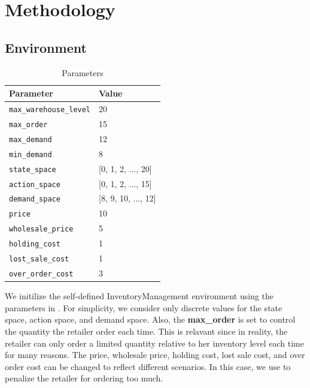 \section{Methodology}
\subsection{Environment}
\begin{table}[H]
    \centering
    \begin{tabular}{|l|l|}
        \hline
        \textbf{Parameter}             & \textbf{Value}      \\
        \hline
        \texttt{max\_warehouse\_level} & 20                  \\
        \texttt{max\_order}            & 15                  \\
        \texttt{max\_demand}           & 12                  \\
        \texttt{min\_demand}           & 8                   \\
        \texttt{state\_space}          & [0, 1, 2, ..., 20]  \\
        \texttt{action\_space}         & [0, 1, 2, ..., 15]  \\
        \texttt{demand\_space}         & [8, 9, 10, ..., 12] \\
        \texttt{price}                 & 10                  \\
        \texttt{wholesale\_price}      & 5                   \\
        \texttt{holding\_cost}         & 1                   \\
        \texttt{lost\_sale\_cost}      & 1                   \\
        \texttt{over\_order\_cost}     & 3                   \\
        \hline
    \end{tabular}
    \caption{Parameters}
    \label{tab:pars}
\end{table}
We initilize the self-defined InventoryManagement environment using the parameters in . For simplicity, we consider only discrete values for the state space, action space, and demand space. Also, the \textbf{max\_order} is set to control the quantity the retailer order each time. This is relavant since in reality, the retailer can only order a limited quantity relative to her inventory level each time for many reasons. The price, wholesale price, holding cost, lost sale cost, and over order cost can be changed to reflect different scenarios. In this case, we use  to penalize the retailer for ordering too much.



